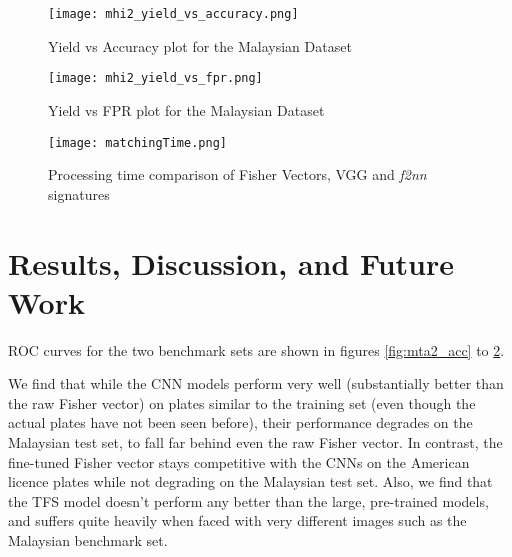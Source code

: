 \documentclass[10pt,twocolumn,letterpaper]{article}
\begin{document}
        \begin{figure}[!t]
        \begin{center}
            \texttt{[image: mhi2\_yield\_vs\_accuracy.png]}
            \caption{Yield vs Accuracy plot for the Malaysian Dataset}
            \label{fig:mhi2_acc}
        \end{center}
        \end{figure}
        
        \begin{figure}[!t]
        \begin{center}
            \texttt{[image: mhi2\_yield\_vs\_fpr.png]}
            \caption{Yield vs FPR plot for the Malaysian Dataset}
            \label{fig:mhi2_fpr}
        \end{center}
        \end{figure}


        \begin{figure}[!t]
            \begin{center}
                \texttt{[image: matchingTime.png]}
                \caption{Processing time comparison of Fisher Vectors, VGG and \emph{f2nn} signatures}
                \label{fig:mta2_match}
            \end{center}
        \end{figure}   
\section{Results, Discussion, and Future Work}\label{sec:results}
    
    ROC curves for the two benchmark sets are shown in figures \ref{fig:mta2_acc} to \ref{fig:mhi2_fpr}.

    We find that while the CNN models perform very well (substantially better than the raw Fisher vector) on plates similar to the training set (even though the actual plates have not been seen before), their performance degrades on the Malaysian test set, to fall far behind even the raw Fisher vector. In contrast, the fine-tuned Fisher vector stays competitive with the CNNs on the American licence plates while not degrading on the Malaysian test set. Also, we find that the TFS model doesn't perform any better than the large, pre-trained models, and suffers quite heavily when faced with very different images such as the Malaysian benchmark set.
 
\end{document}

